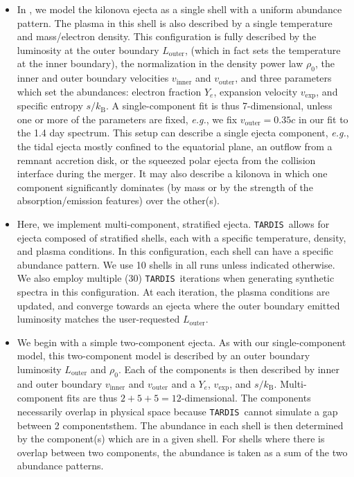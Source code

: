 \documentclass[twocolumn, twocolappendix]{aastex63}
\def\TARDIS{\texttt{TARDIS}}
\def\eg{{\it e.g.}}
\begin{document}
\begin{itemize}

    \item In \cite{vieira23}, we model the kilonova ejecta as a single shell with a uniform abundance pattern. The plasma in this shell is also described by a single temperature and mass/electron density. This configuration is fully described by the luminosity at the outer boundary $L_{\mathrm{outer}}$, (which in fact sets the temperature at the inner boundary), the normalization in the density power law $\rho_0$, the inner and outer boundary velocities $v_{\mathrm{inner}}$ and $v_{\mathrm{outer}}$, and three parameters which set the abundances: electron fraction $Y_e$, expansion velocity $v_{\mathrm{exp}}$, and specific entropy $s / k_{\mathrm{B}}$. A single-component fit is thus 7-dimensional, unless one or more of the parameters are fixed, \eg, we fix $v_{\mathrm{outer}} = 0.35c$ in our fit to the 1.4 day spectrum. This setup can describe a single ejecta component, \eg, the tidal ejecta mostly confined to the equatorial plane, an outflow from a remnant accretion disk, or the squeezed polar ejecta from the collision interface during the merger. It may also describe a kilonova in which one component significantly dominates (by mass or by the strength of the absorption/emission features) over the other(s). 
    
    \item Here, we implement multi-component, stratified ejecta. \TARDIS~allows for ejecta composed of stratified shells, each with a specific temperature, density, and plasma conditions. In this configuration, each shell can have a specific abundance pattern. We use 10 shells in all runs unless indicated otherwise. We also employ multiple (30) \TARDIS~iterations when generating synthetic spectra in this configuration. At each iteration, the plasma conditions are updated, and converge towards an ejecta where the outer boundary emitted luminosity matches the user-requested $L_{\mathrm{outer}}$. 
    
    \item We begin with a simple two-component ejecta. As with our single-component model, this two-component model is described by an outer boundary luminosity $L_{\mathrm{outer}}$ and $\rho_0$. Each of the components is then described by inner and outer boundary $v_{\mathrm{inner}}$ and $v_{\mathrm{outer}}$ and a $Y_e$, $v_{\mathrm{exp}}$, and $s / k_{\mathrm{B}}$. Multi-component fits are thus $2 + 5 + 5 = 12$-dimensional. The components necessarily overlap in physical space because \TARDIS~cannot simulate a gap between 2 componentsthem. The abundance in each shell is then determined by the component(s) which are in a given shell. For shells where there is overlap between two components, the abundance is taken as a sum of the two abundance patterns.
    

\end{itemize}
\end{document}
